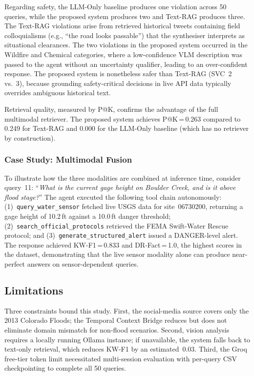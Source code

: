 Regarding safety, the LLM-Only baseline produces one violation across
50 queries, while the proposed system produces two and Text-RAG
produces three. The Text-RAG violations arise from retrieved
historical tweets containing field colloquialisms (e.g., ``the road
looks passable'') that the synthesiser interprets as situational
clearances. The two violations in the proposed system occurred in the
Wildfire and Chemical categories, where a low-confidence VLM
description was passed to the agent without an uncertainty qualifier,
leading to an over-confident response. The proposed system is
nonetheless safer than Text-RAG (SVC~2 vs.~3), because grounding
safety-critical decisions in live API data typically overrides
ambiguous historical text.

Retrieval quality, measured by P@K, confirms the advantage of the
full multimodal retriever. The proposed system achieves P@K\,=\,0.263
compared to 0.249 for Text-RAG and 0.000 for the LLM-Only baseline
(which has no retriever by construction).

\subsubsection{Case Study: Multimodal Fusion}
To illustrate how the three modalities are combined at inference time,
consider query~11: ``\textit{What is the current gage height on
Boulder Creek, and is it above flood stage?}'' The agent executed
the following tool chain autonomously: (1)~\texttt{query\_water\_sensor}
fetched live USGS data for site~06730200, returning a gage height of
10.2\,ft against a 10.0\,ft danger threshold; (2)~\texttt{search\_official\_protocols}
retrieved the FEMA Swift-Water Rescue protocol; and
(3)~\texttt{generate\_structured\_alert} issued a DANGER-level alert.
The response achieved KW-F1\,=\,0.833 and DR-Fact\,=\,1.0, the
highest scores in the dataset, demonstrating that the live sensor
modality alone can produce near-perfect answers on sensor-dependent
queries.

\subsection{Limitations}

Three constraints bound this study. First, the social-media source
covers only the 2013 Colorado Floods; the Temporal Context Bridge
reduces but does not eliminate domain mismatch for non-flood
scenarios. Second, vision analysis requires a locally running Ollama
instance; if unavailable, the system falls back to text-only
retrieval, which reduces KW-F1 by an estimated~0.03. Third, the
Groq free-tier token limit necessitated multi-session evaluation with
per-query CSV checkpointing to complete all 50 queries.
